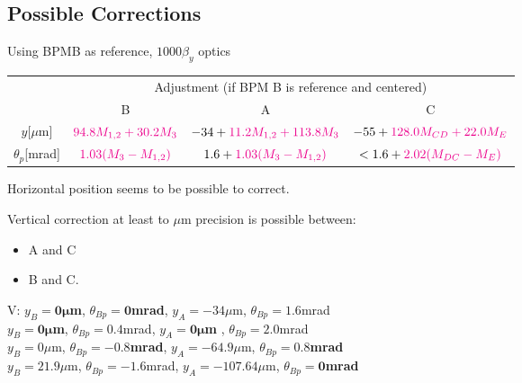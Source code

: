 \subsection{Possible Corrections}
Using BPMB as reference,  $1000\beta_y$ optics\par
\begin{tabular}{|c||c|c|c|}\hline
 &\multicolumn{3}{|c|}{Adjustment (if BPM B is reference and centered)}\\\cline{2-4}
 & B & A & C\\\hline\hline
$y$[$\mu$m]& ${\color{magenta}94.8M_{1,2}+30.2M_3}$ & $-34+{\color{magenta}11.2M_{1,2}+113.8M_3}$&$-55+{\color{magenta}128.0M_{CD}+22.0M_E}$\\
$\theta_{p}$[mrad]& ${\color{magenta}1.03(M_3-M_{1,2})}$ & $1.6+{\color{magenta}1.03(M_3-M_{1,2})}$ &$<1.6+{\color{magenta} 2.02(M_{DC}-M_E)}$\\\hline
\end{tabular}\par
Horizontal position seems to be possible to correct.\par
Vertical correction at least to $\mu$m precision is possible between:
\begin{itemize}
 \item A and C
 \item B and C.
\end{itemize}
V:\hspace*{0.1cm} $y_B=\boldsymbol{0\mu}$\textbf{m}, $\theta_{Bp}=\boldsymbol{0}$\textbf{mrad},\hspace{10mm} $y_A=-34\mu$m, $\theta_{Bp}=1.6$mrad\\
\hspace*{0.45cm} $y_B=\boldsymbol{0\mu}$\textbf{m}, $\theta_{Bp}=0.4$mrad,\hspace{7mm} $y_A=\boldsymbol{0\mu}$\textbf{m	}, $\theta_{Bp}=2.0$mrad\\
\hspace*{0.45cm} $y_B=0\mu$m, $\theta_{Bp}=\boldsymbol{-0.8}$\textbf{mrad},\hspace{3mm} $y_A=-64.9\mu$m, $\theta_{Bp}=\boldsymbol{0.8}$\textbf{mrad}\\
\hspace*{0.45cm} $y_B=21.9\mu$m, $\theta_{Bp}=-1.6$mrad, $y_A=-107.64\mu$m, $\theta_{Bp}=\boldsymbol{0}$\textbf{mrad}\\